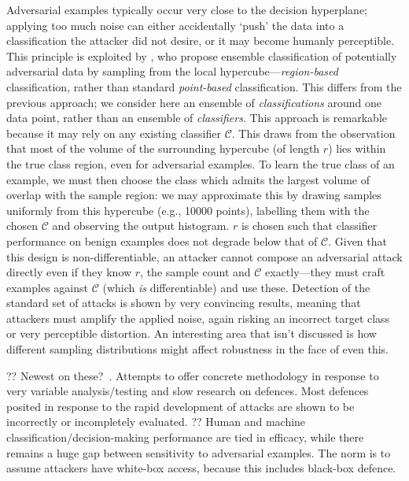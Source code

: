 Adversarial examples typically occur very close to the decision hyperplane; applying too much noise can either accidentally `push' the data into a classification the attacker did not desire, or it may become humanly perceptible.
This principle is exploited by \textcite{DBLP:conf/acsac/CaoG17}, who propose ensemble classification of potentially adversarial data by sampling from the local hypercube---\emph{region-based} classification, rather than standard \emph{point-based} classification.
This differs from the previous approach; we consider here an ensemble of \emph{classifications} around one data point, rather than an ensemble of \emph{classifiers}.
This approach is remarkable because it may rely on any existing classifier $\mathcal{C}$.
This draws from the observation that most of the volume of the surrounding hypercube (of length $r$) lies within the true class region, even for adversarial examples.
To learn the true class of an example, we must then choose the class which admits the largest volume of overlap with the sample region: we may approximate this by drawing samples uniformly from this hypercube (e.g., \num{10000} points), labelling them with the chosen $\mathcal{C}$ and observing the output histogram.
$r$ is chosen such that classifier performance on benign examples does not degrade below that of $\mathcal{C}$.
Given that this design is non-differentiable, an attacker cannot compose an adversarial attack directly even if they know $r$, the sample count and $\mathcal{C}$ exactly---they must craft examples against $\mathcal{C}$ (which \emph{is} differentiable) and use these.
Detection of the standard set of attacks \cite{DBLP:conf/sp/Carlini017} is shown by very convincing results, meaning that attackers must amplify the applied noise, again risking an incorrect target class or very perceptible distortion.
An interesting area that isn't discussed is how different sampling distributions might affect robustness in the face of even this.

?? Newest on these?~\parencite{DBLP:journals/corr/abs-1902-06705}. Attempts to offer concrete methodology in response to very variable analysis/testing and slow research on defences. Most defences posited in response to the rapid development of attacks are shown to be incorrectly or incompletely evaluated. ?? Human and machine classification/decision-making performance are tied in efficacy, while there remains a huge gap between sensitivity to adversarial examples. The norm is to assume attackers have white-box access, because this includes black-box defence.

